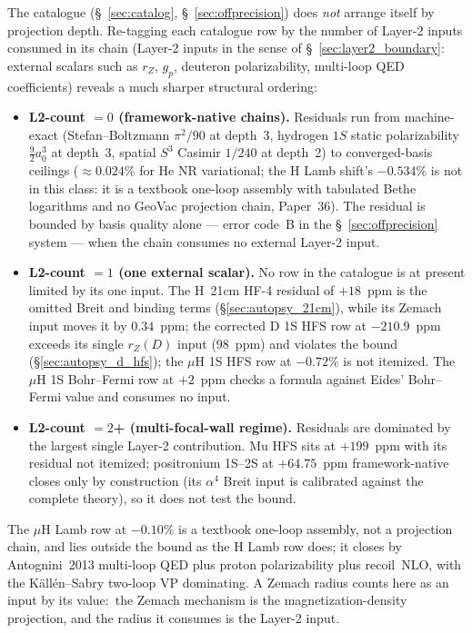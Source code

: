 \documentclass[11pt]{article}
\begin{document}
The catalogue (\S~\ref{sec:catalog}, \S~\ref{sec:offprecision}) does
\emph{not} arrange itself by projection depth.  Re-tagging each
catalogue row by the number of Layer-2 inputs consumed in its chain
(Layer-2 inputs in the sense of \S~\ref{sec:layer2_boundary}:
external scalars such as $r_Z$, $g_p$, deuteron polarizability,
multi-loop QED coefficients) reveals a much sharper structural
ordering:
\begin{itemize}\setlength\itemsep{0pt}
\item \textbf{L2-count $= 0$ (framework-native chains).}  Residuals
run from machine-exact (Stefan--Boltzmann $\pi^2/90$ at depth~3,
hydrogen $1S$ static polarizability $\tfrac{9}{2}a_0^3$ at depth~3,
spatial $S^3$ Casimir $1/240$ at depth~2) to converged-basis
ceilings ($\approx 0.024\%$ for He NR variational; the H Lamb shift's
$-0.534\%$ is not in this class: it is a textbook one-loop assembly with
tabulated Bethe logarithms and no GeoVac projection chain, Paper~36).
The residual is bounded
by basis quality alone --- error code~B in the
\S~\ref{sec:offprecision} system --- when the chain consumes no
external Layer-2 input.
\item \textbf{L2-count $= 1$ (one external scalar).}  No row in the
catalogue is at present limited by its one input.  The H~21cm HF-4
residual of $+18$~ppm is the omitted Breit and binding terms
(\S\ref{sec:autopsy_21cm}), while its Zemach input moves it by
$0.34$~ppm; the corrected D 1S HFS row at $-210.9$~ppm exceeds its
single $r_Z(D)$ input ($98$~ppm) and violates the bound
(\S\ref{sec:autopsy_d_hfs}); the $\mu$H 1S HFS row at $-0.72\%$ is not
itemized.  The $\mu$H 1S Bohr--Fermi row at $+2$~ppm checks a formula
against Eides' Bohr--Fermi value and consumes no input.
\item \textbf{L2-count $= 2$+ (multi-focal-wall regime).}  Residuals
are dominated by the largest single Layer-2 contribution.  Mu HFS
sits at $+199$~ppm with its residual not itemized; positronium 1S--2S
at $+64.75$~ppm framework-native closes only by construction (its
$\alpha^4$ Breit input is calibrated against the complete theory), so
it does not test the bound.
\end{itemize}
The $\mu$H Lamb row at $-0.10\%$ is a textbook one-loop assembly, not a
projection chain, and lies outside the bound as the H Lamb row does; it
closes by Antognini~2013 multi-loop QED plus proton polarizability plus
recoil~NLO, with the K\"all\'en--Sabry two-loop VP dominating.  A
Zemach radius counts here as an input by its value:\ the Zemach
mechanism is the magnetization-density projection, and the radius it
consumes is the Layer-2 input.
\end{document}

